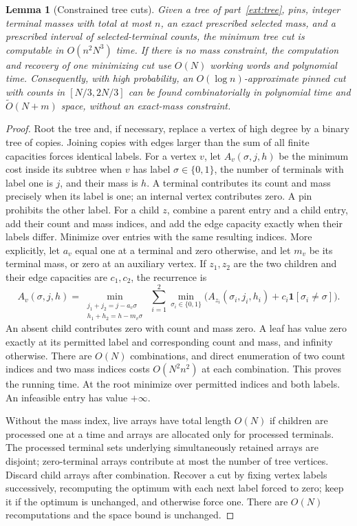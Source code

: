 \documentclass[11pt]{article}
\newtheorem{lemma}[theorem]{Lemma}
\theoremstyle{definition}
\newcommand{\ind}{\mathbf 1}
\newcommand{\wt}{\widetilde}
\begin{document}
\begin{lemma}[Constrained tree cuts]\label{lem:tree-dp}
Given a tree of part~\ref{ext:tree}, pins, integer terminal masses with
total at most $n$, an exact prescribed selected mass, and a prescribed
interval of selected-terminal counts, the minimum tree cut is computable
in $O(n^2N^3)$ time. If there is no mass constraint, the computation and
recovery of one minimizing cut use $O(N)$ working words and polynomial time.
Consequently, with high probability, an $O(\log n)$-approximate pinned
cut with counts in $[N/3,2N/3]$ can be found combinatorially in polynomial time and
$\wt O(N+m)$ space, without an exact-mass constraint.
\end{lemma}
\begin{proof}
Root the tree and, if necessary, replace a vertex of high degree by a binary
tree of copies. Joining copies with edges larger than the sum of all finite
capacities forces identical labels. For a vertex $v$, let
$A_v(\sigma,j,h)$ be the minimum cost inside its subtree when $v$ has
label $\sigma\in\{0,1\}$, the number of terminals with label one is $j$,
and their mass is $h$. A terminal contributes its count and mass precisely
when its label is one; an internal vertex contributes zero. A pin prohibits
the other label. For a child $z$, combine a parent entry and a child entry,
add their count and mass indices, and add the edge capacity exactly when
their labels differ. Minimize over entries with the same resulting indices.
More explicitly, let $a_v$ equal one at a terminal and zero otherwise,
and let $m_v$ be its terminal mass, or zero at an auxiliary vertex.
If $z_1,z_2$ are the two children and their edge capacities are
$c_1,c_2$, the recurrence is
\[
 A_v(\sigma,j,h)=
 \min_{\substack{j_1+j_2=j-a_v\sigma\\h_1+h_2=h-m_v\sigma}}
 \ \sum_{i=1}^2\min_{\sigma_i\in\{0,1\}}
 \bigl(A_{z_i}(\sigma_i,j_i,h_i)+c_i\ind[\sigma_i\ne\sigma]\bigr).
\]
An absent child contributes zero with count and mass zero. A leaf has
value zero exactly at its permitted label and corresponding count and
mass, and infinity otherwise. There are $O(N)$ combinations, and direct
enumeration of two count indices and two mass indices costs
$O(N^2n^2)$ at each combination. This proves the running time.
At the root minimize over permitted indices and both labels. An infeasible
entry has value $+\infty$.

Without the mass index, live arrays have total length $O(N)$ if children are
processed one at a time and arrays are allocated only for processed
terminals. The processed terminal sets underlying simultaneously retained
arrays are disjoint; zero-terminal arrays contribute at most the number
of tree vertices. Discard child arrays after combination. Recover a cut by
fixing vertex labels successively, recomputing the optimum with each next
label forced to zero; keep it if the optimum is unchanged, and otherwise
force one. There are $O(N)$ recomputations and the space bound is unchanged.


\end{proof}
\end{document}
